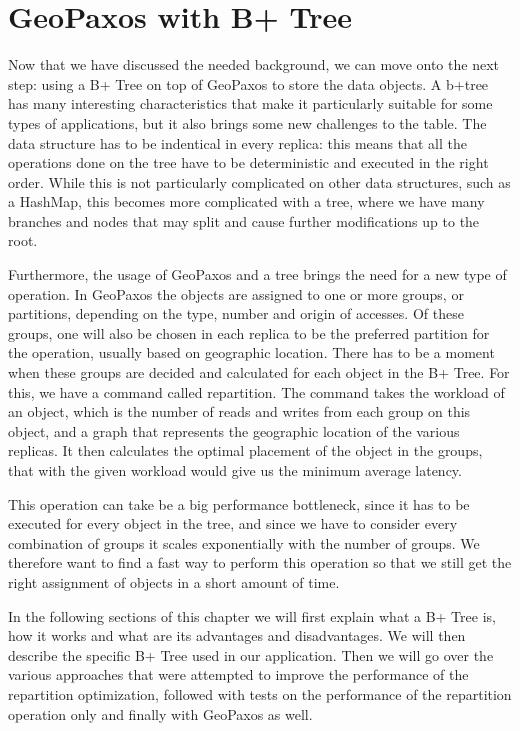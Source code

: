 \chapter{GeoPaxos with B+ Tree}\label{sec:geopaxos-with-b+tree}
Now that we have discussed the needed background, we can move onto the next step: using a B+ Tree on top of GeoPaxos to store the data objects. A b+tree has many interesting characteristics that make it particularly suitable for some types of applications, but it also brings some new challenges to the table. The data structure has to be indentical in every replica: this means that all the operations done on the tree have to be deterministic and executed in the right order. While this is not particularly complicated on other data structures, such as a HashMap, this becomes more complicated with a tree, where we have many branches and nodes that may split and cause further modifications up to the root.

Furthermore, the usage of GeoPaxos and a tree brings the need for a new type of operation. In GeoPaxos the objects are assigned to one or more groups, or partitions, depending on the type, number and origin of accesses. Of these groups, one will also be chosen in each replica to be the preferred partition for the operation, usually based on geographic location. There has to be a moment when these groups are decided and calculated for each object in the B+ Tree. For this, we have a command called repartition. The command takes the workload of an object, which is the number of reads and writes from each group on this object, and a graph that represents the geographic location of the various replicas. It then calculates the optimal placement of the object in the groups, that with the given workload would give us the minimum average latency.

This operation can take be a big performance bottleneck, since it has to be executed for every object in the tree, and since we have to consider every combination of groups it scales exponentially with the number of groups. We therefore want to find a fast way to perform this operation so that we still get the right assignment of objects in a short amount of time.

In the following sections of this chapter we will first explain what a B+ Tree is, how it works and what are its advantages and disadvantages. We will then describe the specific B+ Tree used in our application. Then we will go over the various approaches that were attempted to improve the performance of the repartition optimization, followed with tests on the performance of the repartition operation only and finally with GeoPaxos as well.

